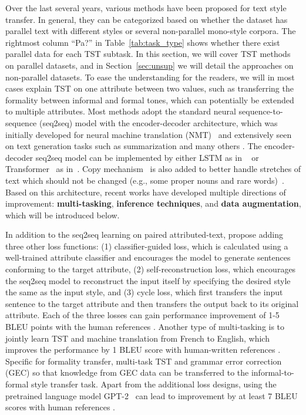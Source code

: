 \label{sec:sup}
Over the last several years, various methods have been proposed for text style transfer. In general, they can be categorized based on whether the dataset has parallel text with different styles or several non-parallel mono-style corpora. The rightmost column ``Pa?'' in Table~\ref{tab:task_type} shows whether there exist parallel data for each TST subtask. 
In this section, we will cover TST methods on parallel datasets, and in Section~\ref{sec:unsup} we will detail the approaches on non-parallel datasets.
To ease the understanding for the readers, we will in most cases explain TST on one attribute between two values, such as transferring the formality between informal and formal tones, which can potentially be extended to multiple attributes.
Most methods adopt the standard neural sequence-to-sequence (seq2seq) model with the encoder-decoder architecture, which was initially developed for neural machine translation (NMT)~ and extensively seen on text generation tasks such as summarization  and many others . The encoder-decoder seq2seq model can be implemented by either LSTM as in ~ or Transformer~ as in~. Copy mechanism~ is also added to better handle stretches of text which should not be changed (e.g., some proper nouns and rare words)~. Based on this architecture, recent works have developed multiple directions of improvement: \textbf{multi-tasking}, \textbf{inference techniques}, and \textbf{data augmentation}, which will be introduced below.

In addition to the seq2seq learning on paired attributed-text,  propose adding three other loss functions: (1) classifier-guided loss, which is calculated using a well-trained attribute classifier and encourages the model to generate sentences conforming to the target attribute, (2) self-reconstruction loss, which encourages the seq2seq model to reconstruct the input itself by specifying the desired style the same as the input style, and (3) cycle loss, which first transfers the input sentence to the target attribute and then transfers the output back to its original attribute. Each of the three losses can gain performance improvement of 1-5 BLEU points with the human references . Another type of multi-tasking is to jointly learn TST and machine translation from French to English, which improves the performance by 1 BLEU score with human-written references . 
Specific for formality transfer,  multi-task TST and grammar error correction (GEC) so that knowledge from GEC data can be transferred to the informal-to-formal style transfer task. 
Apart from the additional loss designs, using the pretrained language model GPT-2~ can lead to improvement by at least 7 BLEU scores with human references .

